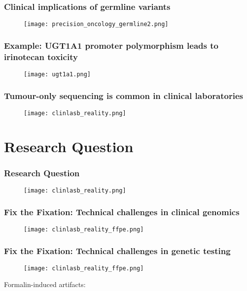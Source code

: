 \documentclass{beamer}
\begin{document}
\begin{frame}
\frametitle{Clinical implications of germline variants}
\begin{figure}[t]
    \texttt{[image: precision\_oncology\_germline2.png]}
\end{figure}
\end{frame}

\begin{frame}
\frametitle{Example: UGT1A1 promoter polymorphism leads to irinotecan toxicity}
\begin{figure}[t]
    \texttt{[image: ugt1a1.png]}
\end{figure}
\end{frame}

\begin{frame}
\frametitle{Tumour-only sequencing is common in clinical laboratories}
\begin{figure}[t]
    \texttt{[image: clinlasb\_reality.png]}
\end{figure}
\end{frame}

\section{Research Question}
\begin{frame}
\frametitle{Research Question}
\begin{figure}[t]
    \texttt{[image: clinlasb\_reality.png]}
\end{figure}
\centering
{}
\end{frame}


\begin{frame}
\frametitle{Fix the Fixation: Technical challenges in clinical genomics}
\begin{figure}[t]
    \texttt{[image: clinlasb\_reality\_ffpe.png]}
\end{figure}
\end{frame}

\begin{frame}
\frametitle{Fix the Fixation: Technical challenges in genetic testing}
\begin{figure}[t]
    \texttt{[image: clinlasb\_reality\_ffpe.png]}
\end{figure}
Formalin-induced artifacts:
\begin{enumerate}
\end{enumerate}
\end{frame}
\end{document}
